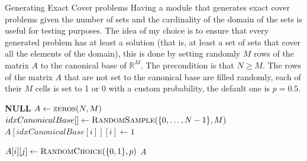 \documentclass{beamer}
\begin{document}
\begin{frame}{Generating Exact Cover problems}
    Having a module that generates exact cover problems given the 
    number of sets and the cardinality of the domain of the sets is
    useful for testing purposes.
    The idea of my choice is to ensure
    that every generated problem has at least a solution (that is, at least a set 
    of sets that cover all the elements of the domain),
    this is done by setting randomly $M$ rows of the matrix $A$ to 
    the canonical base of $\mathbb{R}^M$.
    The precondition is that $N \geq M$.
    The rows of the matrix $A$ that are not set to the canonical base
    are filled randomly, each of their $M$ cells is set to 1 or 0 with
    a custom probability, the default one is $p=0.5$.
\end{frame}

\begin{frame}{}
    \begin{algorithmic}
                \State \Return \textbf{NULL}
            \EndIf
            \State $A \gets \Call{zeros}{N, M}$
            \State $idxCanonicalBase[] \gets \Call{RandomSample}{\{0,\dots,N-1\}, M}$ 
                \State $A[idxCanonicalBase[i]][i] \gets 1$
            \EndFor

                        \State $A[i][j] \gets \Call{RandomChoice}{\{0,1\}, p}$
                    \EndFor
                \EndIf
            \EndFor
            \State \Return $A$
        \EndFunction
    \end{algorithmic}
\end{frame}
\end{document}
